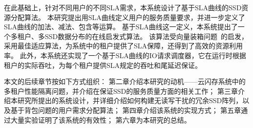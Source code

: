在此基础上，针对不同用户的不同SLA需求，本系统设计了基于SLA曲线的SSD资源分配算法。
本研究提出用SLA曲线定义用户的服务质量要求，并进一步定义了SLA曲线的加法、减法、包含等运算。
基于SLA曲线这一定义，本系统提出了一个多租户、多SSD数据分布的在线启发式算法。
该算法受向量装箱问题~\cite{panigrahy2011heuristics,hu2003operations}的启发，采用最佳适应算法，为系统中的租户提供了SLA保障，还得到了高效的资源利用率。
此外，本系统还实现了一个基于SLA曲线的IO请求调度器，它在运行时根据租户的实际吞吐，为每个租户提供SLA规定的吞吐和尾延迟保证。

本文的后续章节按如下方式组织：
第二章介绍本研究的动机——云闪存系统中的多租户性能隔离问题，并介绍在保证SSD的服务质量方面的相关工作；
第三章介绍本研究所提出的系统设计，并详细介绍如何构建无读写干扰的冗余SSD阵列，以及基于背包问题的用户需求分配算法；
第四章介绍该系统的实现方式；
第五章通过大量实验证明了该系统的有效性；
第六章为本研究的总结。